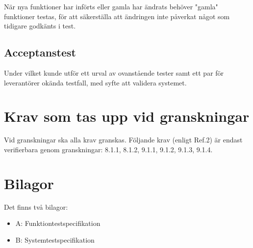\documentclass[a4paper]{article}
\begin{document}
När nya funktioner har införts eller gamla har ändrats behöver "gamla" funktioner testas, för att säkerställa att ändringen inte påverkat något som tidigare godkänts i test.

\subsection{Acceptanstest}

Under vilket kunde utför ett urval av ovanstående tester samt ett par för leverantörer okända testfall, med syfte att validera systemet.

\section{Krav som tas upp vid granskningar}

Vid granskningar ska alla krav granskas.
Följande krav (enligt Ref.2) är endast verifierbara genom granskningar: 8.1.1, 8.1.2, 9.1.1, 9.1.2, 9.1.3, 9.1.4.

\section{Bilagor}

Det finns två bilagor:

\begin{itemize}
\item A: Funktiontestspecifikation
\item B: Systemtestspecifikation

\end{itemize}

\newpage
\end{document}
